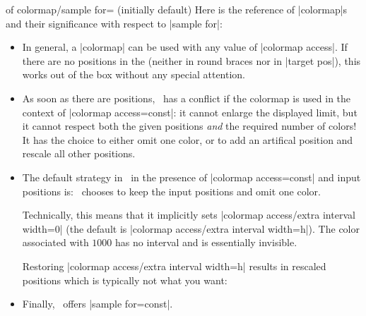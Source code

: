 {\begin{enumerate}
\begin{pgfplotskey}{of colormap/sample for= (initially default)}
	Here is the reference of |colormap|s and their significance with respect to |sample for|:
	\begin{itemize}
		\item In general, a |colormap| can be used with any value of |colormap access|. If there are no positions in the  (neither in round braces nor in |target pos|), this works out of the box without any special attention.
\begin{codeexample}[]
\pgfplotscolorbardrawstandalone[
	colormap={example}{%
		samples of colormap={
			5 of viridis,
		}
	},
	colorbar horizontal,
	colormap access=const]
\end{codeexample}
		\item As soon as there are positions, \PGFPlots\ has a conflict if the colormap is used in the context of |colormap access=const|: it cannot enlarge the displayed limit, but it cannot respect both the given positions \emph{and} the required number of colors! It has the choice to either omit one color, or to add an artifical position and rescale all other positions.
		\item The default strategy in \PGFPlots\ in the presence of |colormap access=const| and input positions is: \PGFPlots\ chooses to keep the input positions and omit one color.
\begin{codeexample}[]
\pgfplotscolorbardrawstandalone[
	colormap={example}{%
		of colormap={
			viridis,
			target pos={0,500,850,950,1000},
		}
	},
	colorbar horizontal,
	colormap access=const]
\end{codeexample}

		Technically, this means that it implicitly sets |colormap access/extra interval width=0| (the default is |colormap access/extra interval width=h|). The color associated with $1000$ has no interval and is essentially invisible.

		Restoring |colormap access/extra interval width=h| results in rescaled positions which is typically not what you want:
\begin{codeexample}[]
\pgfplotscolorbardrawstandalone[
	colormap={example}{%
		samples of colormap={
			5 of viridis,
			target pos={0,500,850,950,1000},
		}
	},
	colormap access/extra interval width=h,
	colorbar horizontal,
	colormap access=const]
\end{codeexample}
		\item Finally, \PGFPlots\ offers |sample for=const|. 
		

\end{itemize}
\end{pgfplotskey}
\end{enumerate}}
